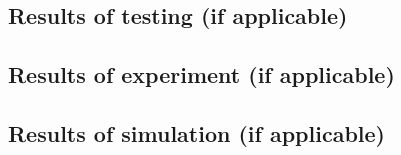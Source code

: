 
\subsection{Results of testing (if applicable)}

\lipsum[2]

\subsection{Results of experiment (if applicable)}

\lipsum[1]

\subsection{Results of simulation (if applicable)}

\lipsum[3]